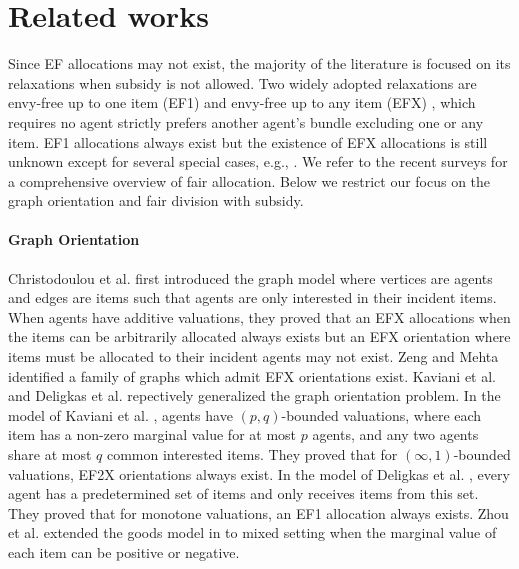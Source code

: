 \section{Related works}
Since EF allocations may not exist, the majority of the literature is focused on its relaxations when subsidy is not allowed. Two widely adopted relaxations are envy-free up to one item (EF1) \cite{budish2011combinatorial} and envy-free up to any item (EFX) \cite{DBLP:journals/teco/CaragiannisKMPS19}, which requires no agent strictly prefers another agent's bundle excluding one or any item.
EF1 allocations always exist \cite{DBLP:conf/sigecom/LiptonMMS04} but the existence of EFX allocations is still unknown except for several special cases, e.g., \cite{DBLP:journals/siamdm/PlautR20,DBLP:journals/jacm/ChaudhuryGM24}. 
We refer to the recent surveys \cite{DBLP:journals/ai/AmanatidisABFLMVW23,DBLP:journals/jair/LiuLSW24} for a comprehensive overview of fair allocation.
Below we restrict our focus on the graph orientation and fair division with subsidy.

\paragraph{Graph Orientation}
Christodoulou et al. \cite{DBLP:conf/sigecom/0001FKS23} first introduced the graph model where vertices are agents and edges are items such that agents are only interested in their incident items.
When agents have additive valuations, they proved that an EFX allocations when the items can be arbitrarily allocated always exists but an EFX orientation where items must be allocated to their incident agents may not exist.
Zeng and Mehta \cite{zeng2024structureefxorientationsgraphs} identified a family of graphs which admit EFX orientations exist. 
Kaviani et al. \cite{DBLP:journals/corr/abs-2407-05139} and Deligkas et al. \cite{deligkas2024ef1efxorientations} 
repectively generalized the graph orientation problem.
In the model of Kaviani et al. \cite{DBLP:journals/corr/abs-2407-05139}, agents have $(p,q)$-bounded valuations, where each item has a non-zero marginal value for at most $p$ agents, and any two agents share at most $q$ common interested items. 
They proved that for $(\infty,1)$-bounded valuations, EF2X orientations always exist.
In the model of Deligkas et al. \cite{deligkas2024ef1efxorientations}, every agent has a predetermined set of items and only receives items from this set. They proved that for monotone valuations, an EF1 allocation always exists. 
Zhou et al. \cite{zhoucomplete} extended the goods model in \cite{DBLP:conf/sigecom/0001FKS23} to mixed setting when the marginal value of each item can be positive or negative.



